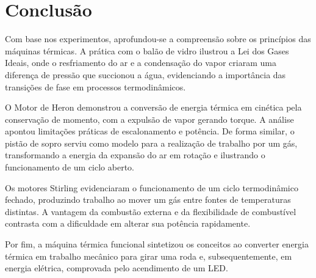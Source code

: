 \section{Conclusão} 
Com base nos experimentos, aprofundou-se a compreensão sobre os princípios das máquinas térmicas. A prática com o balão de vidro ilustrou a Lei dos Gases Ideais, onde o resfriamento do ar e a condensação do vapor criaram uma diferença de pressão que succionou a água, evidenciando a importância das transições de fase em processos termodinâmicos.

O Motor de Heron demonstrou a conversão de energia térmica em cinética pela conservação de momento, com a expulsão de vapor gerando torque. A análise apontou limitações práticas de escalonamento e potência. De forma similar, o pistão de sopro serviu como modelo para a realização de trabalho por um gás, transformando a energia da expansão do ar em rotação e ilustrando o funcionamento de um ciclo aberto.

Os motores Stirling evidenciaram o funcionamento de um ciclo termodinâmico fechado, produzindo trabalho ao mover um gás entre fontes de temperaturas distintas. A vantagem da combustão externa e da flexibilidade de combustível contrasta com a dificuldade em alterar sua potência rapidamente.


Por fim, a máquina térmica funcional sintetizou os conceitos ao converter energia térmica em trabalho mecânico para girar uma roda e, subsequentemente, em energia elétrica, comprovada pelo acendimento de um LED.
